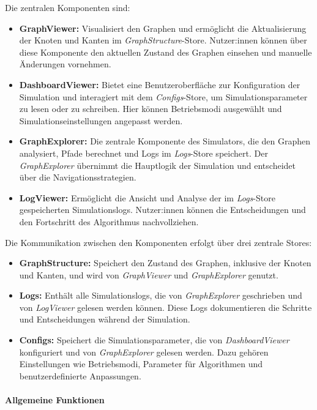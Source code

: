 \documentclass[main.tex]{subfiles} %
\begin{document}
Die zentralen Komponenten sind:
\begin{itemize}
  \item \textbf{GraphViewer:} Visualisiert den Graphen und ermöglicht
    die Aktualisierung der Knoten und Kanten im
    \textit{GraphStructure}-Store. Nutzer:innen können über diese
    Komponente den aktuellen Zustand des Graphen einsehen und
    manuelle Änderungen vornehmen.
  \item \textbf{DashboardViewer:} Bietet eine Benutzeroberfläche zur
    Konfiguration der Simulation und interagiert mit dem
    \textit{Configs}-Store, um Simulationsparameter zu lesen oder zu
    schreiben. Hier können Betriebsmodi ausgewählt und
    Simulationseinstellungen angepasst werden.
  \item \textbf{GraphExplorer:} Die zentrale Komponente des
    Simulators, die den Graphen analysiert, Pfade berechnet und Logs
    im \textit{Logs}-Store speichert. Der \textit{GraphExplorer}
    übernimmt die Hauptlogik der Simulation und entscheidet über die
    Navigationsstrategien.
  \item \textbf{LogViewer:} Ermöglicht die Ansicht und Analyse der im
    \textit{Logs}-Store gespeicherten Simulationslogs. Nutzer:innen
    können die Entscheidungen und den Fortschritt des Algorithmus
    nachvollziehen.
\end{itemize}

Die Kommunikation zwischen den Komponenten erfolgt über drei zentrale Stores:
\begin{itemize}
  \item \textbf{GraphStructure:} Speichert den Zustand des Graphen,
    inklusive der Knoten und Kanten, und wird von
    \textit{GraphViewer} und \textit{GraphExplorer} genutzt.
  \item \textbf{Logs:} Enthält alle Simulationslogs, die von
    \textit{GraphExplorer} geschrieben und von \textit{LogViewer}
    gelesen werden können. Diese Logs dokumentieren die Schritte und
    Entscheidungen während der Simulation.
  \item \textbf{Configs:} Speichert die Simulationsparameter, die von
    \textit{DashboardViewer} konfiguriert und von
    \textit{GraphExplorer} gelesen werden. Dazu gehören Einstellungen
    wie Betriebsmodi, Parameter für Algorithmen und
    benutzerdefinierte Anpassungen.
\end{itemize}

\paragraph{Allgemeine Funktionen}
\end{document}
